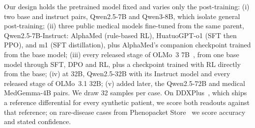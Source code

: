 \documentclass[11pt]{article}
\begin{document}
Our design holds the pretrained model fixed and varies only the post-training:
(i) two base and instruct pairs, Qwen2.5-7B and Qwen3-8B, which isolate general post-training;
(ii) three public medical models fine-tuned from the same parent, Qwen2.5-7B-Instruct: AlphaMed (rule-based RL), HuatuoGPT-o1 (SFT then PPO), and m1 (SFT distillation), plus AlphaMed's companion checkpoint trained from the base model;
(iii) every released stage of OLMo~3 7B~\citep{olmo2025olmo3}, from one base model through SFT, DPO and RL, plus a checkpoint trained with RL directly from the base;
(iv) at 32B, Qwen2.5-32B with its Instruct model and every released stage of OLMo~3.1 32B; (v) added later, the Qwen2.5-72B and medical MedGemma-4B pairs.
We draw 32 samples per case. On DDXPlus~\citep{fansi2022ddxplus}, which ships a reference differential for every synthetic patient, we score both readouts against that reference; on rare-disease cases from Phenopacket Store~\citep{danis2025phenopacketstore} we score accuracy and stated confidence.
\end{document}
